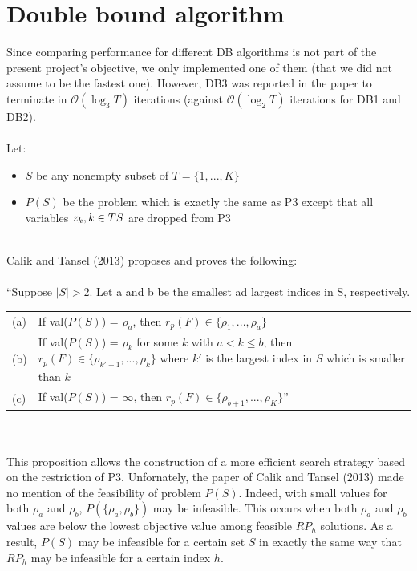\section{Double bound algorithm}
Since comparing performance for different DB algorithms is not part
of the present project's objective, we only implemented one of them (that we did not assume to be the fastest
one). However, DB3 was reported in the paper to terminate in $\mathcal{O}(\log_3 T)$ iterations (against $\mathcal{O}(\log_2 T)$ iterations for DB1 and DB2).\\\\
Let:
\begin{itemize}
	\item $S$ be any nonempty subset of $T = \lbrace 1, ..., K \rbrace$
	\item $P(S)$ be the problem which is exactly the same as P3 except that all variables $z_k, k \in T\\S$ are dropped from P3
\end{itemize}\ \\
Calik and Tansel (2013) proposes and proves the following:\\\\
``Suppose $|S| > 2$. Let a and b be the smallest ad largest indices in S, respectively.\\
\begin{tabularx}{\textwidth}{l X}
(a) & If val($P(S)$) = $\rho_a$, then $r_p(F) \in \lbrace \rho_1, ..., \rho_a \rbrace$\\
(b) & If val($P(S)$) = $\rho_k$ for some $k$ with $a < k \leq b$, then $r_p(F) \in \lbrace \rho_{k'+1}, ..., \rho_k \rbrace$ where $k'$ is the largest index in $S$ which is smaller than $k$ \\
(c) & If val($P(S)$) = $\infty$, then $r_p(F) \in \lbrace \rho_{b+1}, ..., \rho_K \rbrace$''\\
\end{tabularx}\ \\\\
This proposition allows the construction of a more efficient search strategy based on the restriction of P3. 
Unfornately, the paper of Calik and Tansel (2013) made no mention of the feasibility of problem $P(S)$.
Indeed, with small values for both $\rho_a$ and $\rho_b$, $P(\{\rho_a, \rho_b\})$ may be infeasible.
This occurs when both $\rho_a$ and $\rho_b$ values are below the lowest objective value among feasible $RP_h$ solutions.
As a result, $P(S)$ may be infeasible for a certain set $S$ in exactly the same way that $RP_h$ may be infeasible for a certain index $h$.
